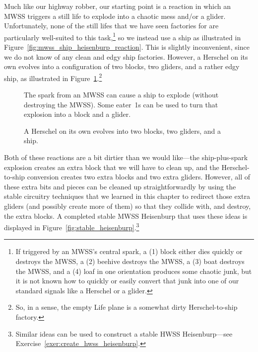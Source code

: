 Much like our highway robber, our starting point is a reaction in which an MWSS triggers a still life to explode into a chaotic mess and/or a glider. Unfortunately, none of the still lifes that we have seen factories for are particularly well-suited to this task,\footnote{If triggered by an MWSS's central spark, a (1) block either dies quickly or destroys the MWSS, a (2) beehive destroys the MWSS, a (3) boat destroys the MWSS, and a (4) loaf in one orientation produces some chaotic junk, but it is not known how to quickly or easily convert that junk into one of our standard signals like a Herschel or a glider.} so we instead use a ship as illustrated in Figure~\ref{fig:mwss_ship_heisenburp_reaction}. This is slightly inconvenient, since we do not know of any clean and edgy ship factories. However, a Herschel on its own evolves into a configuration of two blocks, two gliders, and a rather edgy ship, as illustrated in Figure~\ref{fig:herschel_evolution}.\footnote{So, in a sense, the empty Life plane is a somewhat dirty Herschel-to-ship factory.}

\begin{figure}[!htb]
	\centering
	\begin{minipage}[b]{0.48\textwidth}
		\centering
		\caption{The spark from an MWSS can cause a ship to explode (without destroying the MWSS). Some eater~1s can be used to turn that explosion into a block and a glider.}\label{fig:mwss_ship_heisenburp_reaction}
	\end{minipage} \hfill \begin{minipage}[b]{0.49\textwidth}
		\centering
		\caption{A Herschel on its own evolves into two blocks, two gliders, and a ship.}\label{fig:herschel_evolution}
	\end{minipage}
\end{figure}

Both of these reactions are a bit dirtier than we would like---the ship-plus-spark explosion creates an extra block that we will have to clean up, and the Herschel-to-ship conversion creates two extra blocks and two extra gliders. However, all of these extra bits and pieces can be cleaned up straightforwardly by using the stable circuitry techniques that we learned in this chapter to redirect those extra gliders (and possibly create more of them) so that they collide with, and destroy, the extra blocks. A completed stable MWSS Heisenburp that uses these ideas is displayed in Figure~\ref{fig:stable_heisenburp}.\footnote{Similar ideas can be used to construct a stable HWSS Heisenburp---see Exercise~\ref{exer:create_hwss_heisenburp}.}

